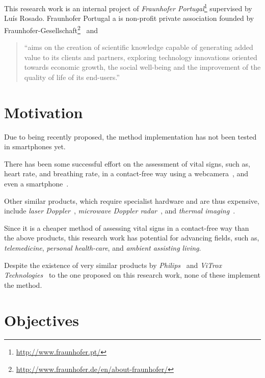 This research work is an internal project of \emph{Fraunhofer
Portugal}\footnote{\url{http://www.fraunhofer.pt/}} supervised by
Luís Rosado. Fraunhofer Portugal a is non-profit private association
founded by Fraunhofer-Gesellschaft\footnote{\url{http://www.fraunhofer.de/en/about-fraunhofer/}}~\cite{Fraunhofer2013} and

\begin{quote}
  ``aims on the creation of scientific knowledge capable of
  generating added value to its clients and partners, exploring
  technology innovations oriented towards economic growth, the
  social well-being and the improvement of the quality of life of
  its end-users.''~\cite{Fraunhofer2013}
\end{quote}

\section{Motivation} \label{sec:intro:motivation}


Due to being recently proposed, the \evm{} method implementation
has not been tested in smartphones yet.

There has been some successful effort on the assessment of vital
signs, such as, heart rate, and breathing rate, in a contact-free
way using a webcamera~\cite{Wu2012Eulerian, Poh2010Non, Poh2011Advancements},
and even a smartphone~\cite{Vitrox2013, Philips2013}.

Other similar products, which require specialist hardware and are
thus expensive, include \emph{laser Doppler}~\cite{Ulyanov1993Pulse},
\emph{microwave Doppler radar}~\cite{Greneker1997Radar}, and
\emph{thermal imaging}~\cite{Garbey2007Contact}.

Since it is a cheaper method of assessing vital signs in a
contact-free way than the above products, this research work has
potential for advancing fields, such as, \emph{telemedicine},
\emph{personal health-care}, and \emph{ambient assisting living}.

Despite the existence of very similar products by
\emph{Philips}~\cite{Philips2013} and
\emph{ViTrox Technologies}~\cite{Vitrox2013}
to the one proposed on this research work, none of these implement
the \evm{} method.

\section{Objectives} \label{sec:intro:objectives}

